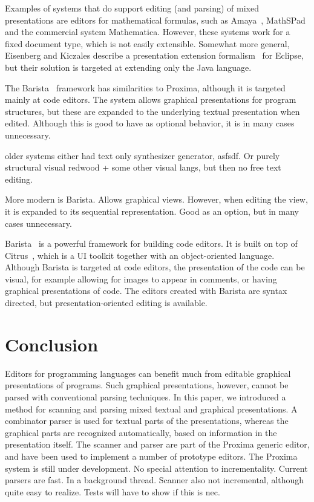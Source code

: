 \documentclass[12pt]{article}
\begin{document}
Examples of systems that do support editing (and parsing) of mixed presentations are editors for mathematical formulas, such as Amaya~\cite{amaya08}, MathSPad~\cite{verhoeven00mathspad} and the commercial system Mathematica. However, these systems work for a fixed document type, which is not easily extensible. Somewhat more general, Eisenberg and Kiczales describe a presentation extension formalism~\cite{eisenberg07presExtension} for Eclipse, but their solution is targeted at extending only the Java language.

The Barista~\cite{KoMyers06Barista} framework has similarities to Proxima, although it is targeted mainly at code editors. The system allows graphical presentations for program structures, but these are expanded to the underlying textual presentation when edited. Although this is good to have as optional behavior, it is in many cases unnecessary.

\bc
older systems either had text only synthesizer generator, asfsdf. Or purely structural visual redwood + some other visual langs, but then no free text editing.


More modern is Barista. Allows graphical views. However, when editing the view, it is expanded to its sequential representation. Good as an option, but in many cases unnecessary. 



\noindent Barista~\cite{KoMyers06Barista} is a powerful framework for building code editors. It is built on top of Citrus~\cite{KoMyers05Citrus}, which is a UI toolkit together with an object-oriented language. Although Barista is targeted at code editors, the presentation of the code can be visual, for example allowing for images to appear in comments, or having graphical presentations of code. The editors created with Barista are syntax directed, but presentation-oriented editing is available. 

\ec



%
\section{Conclusion}\label{sect:conclusion}
%


Editors for programming languages can benefit much from editable graphical presentations of programs. Such graphical presentations, however, cannot be parsed with conventional parsing techniques. In this paper, we introduced a method for scanning and parsing mixed textual and graphical presentations. A combinator parser is used for textual parts of the presentations, whereas the graphical parts are recognized automatically, based on information in the presentation itself. The scanner and parser are part of the Proxima generic editor, and have been used to implement a number of prototype editors.
\bc
The Proxima system is still under development. No special attention to incrementality. Current parsers are fast. In a background thread. Scanner also not incremental, although quite easy to realize. Tests will have to show if this is nec.
\end{document}
